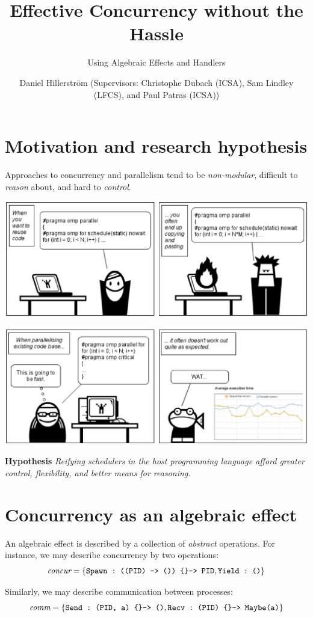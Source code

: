 \documentclass[noback,landscape]{infposter}
\title{Effective Concurrency without the Hassle}
\subtitle{Using Algebraic Effects and Handlers}
\author{Daniel Hillerström \normalsize{(Supervisors: Christophe Dubach (ICSA), Sam Lindley (LFCS), and Paul Patras (ICSA))}}
\begin{document}
\makeposter

\section{Motivation and research hypothesis}
Approaches to concurrency and parallelism tend to be \emph{non-modular},
difficult to \emph{reason} about, and hard to \emph{control}.

\begin{center}
\includegraphics[scale=1.2]{reuse.eps}
\end{center}

\begin{center}
\includegraphics[scale=1.2]{wat.eps}
\end{center}

\textbf{Hypothesis} \emph{Reifying schedulers in the host programming
  language afford greater control, flexibility, and better means for
  reasoning.}
\section{Concurrency as an algebraic effect}
An algebraic effect is described by a collection of \emph{abstract} operations. For instance, we may describe concurrency by two operations:
\[
  \emph{concur} = \{\texttt{\lstinline$Spawn : ((PID) -> ()) \{\}-> PID$}, \texttt{\lstinline$Yield : ()$}\}
\]

Similarly, we may describe communication between processes:
\[
  \emph{comm} = \{\texttt{\lstinline$Send : (PID, a) \{\}-> ()$}, \texttt{\lstinline$Recv : (PID) \{\}-> Maybe(a)$}\}
\]
\vfill
\end{document}
